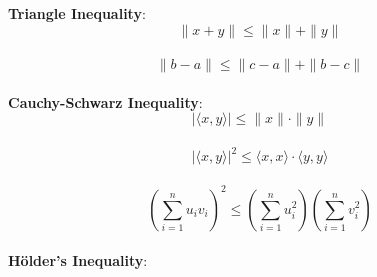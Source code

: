 

\begin{theorem}[]{}
    \textbf{Triangle Inequality}:
    \vspace{-5pt}\\
    \begin{equation*}
        \|{x + y}\| \leq \|{x}\| + \|{y}\|
    \end{equation*}
    \vspace{-15pt}\\
    \begin{equation*}
        \|{b - a}\| \leq \|{c-a}\| + \|{b-c}\|
    \end{equation*}
    \vspace{-5pt}\\
    \textbf{Cauchy-Schwarz Inequality}:
    {\footnotesize
    \vspace{-5pt}\\
    \begin{equation*}
        |{\langle x, y \rangle}| \leq \|x\| \cdot \|y\|
    \end{equation*}
    \vspace{-12pt}\\
    \begin{equation*}
        |{\langle x, y \rangle}|^2 \leq \langle x, x \rangle \cdot \langle y, y \rangle
    \end{equation*}
    \vspace{-12pt}\\
    \begin{equation*}
        \left(\sum_{i=1}^{n}u_iv_i\right)^2 \leq \left(\sum_{i=1}^{n}u_i^2\right)\left(\sum_{i=1}^{n}v_i^2\right)
    \end{equation*}
    \vspace{-5pt}\\
    }
    \textbf{H\"older's Inequality}:

\end{theorem}

